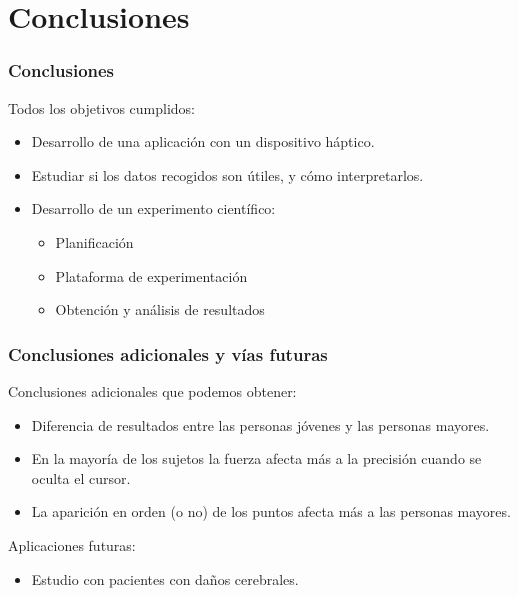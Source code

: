 \documentclass[pdf]{beamer}
\begin{document}
\section{Conclusiones}
\begin{frame}
	\frametitle{Conclusiones}
	Todos los objetivos cumplidos:
	\begin{itemize}
		\item Desarrollo de una aplicación con un dispositivo háptico.
		\item Estudiar si los datos recogidos son útiles, y cómo interpretarlos.
		\item Desarrollo de un experimento científico:
		\begin{itemize}
			\item Planificación
			\item Plataforma de experimentación
			\item Obtención y análisis de resultados
		\end{itemize}
	\end{itemize}

\end{frame}
\begin{frame}
	\frametitle{Conclusiones adicionales y vías futuras}
	Conclusiones adicionales que podemos obtener:
	\begin{itemize}
		\item Diferencia de resultados entre las personas jóvenes y las personas mayores.
		\item En la mayoría de los sujetos la fuerza afecta más a la precisión cuando se oculta el cursor.
		\item La aparición en orden (o no) de los puntos afecta más a las personas mayores.
	\end{itemize}
	Aplicaciones futuras:
	\begin{itemize}
		\item Estudio con pacientes con daños cerebrales. 
	\end{itemize}
\end{frame}
\end{document}
